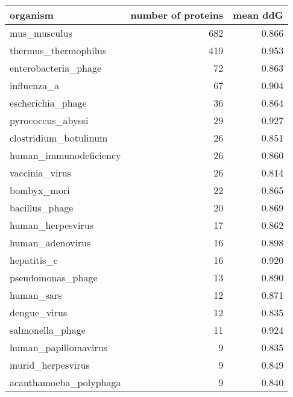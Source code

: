 \begin{tabular}{lrr}
\toprule
                                 organism &  number of proteins &  mean ddG \\
\midrule
                             mus\_musculus &                 682 &     0.866 \\
                     thermus\_thermophilus &                 419 &     0.953 \\
                     enterobacteria\_phage &                  72 &     0.863 \\
                              influenza\_a &                  67 &     0.904 \\
                        escherichia\_phage &                  36 &     0.864 \\
                        pyrococcus\_abyssi &                  29 &     0.927 \\
                    clostridium\_botulinum &                  26 &     0.851 \\
                   human\_immunodeficiency &                  26 &     0.860 \\
                           vaccinia\_virus &                  26 &     0.814 \\
                              bombyx\_mori &                  22 &     0.865 \\
                           bacillus\_phage &                  20 &     0.869 \\
                        human\_herpesvirus &                  17 &     0.862 \\
                         human\_adenovirus &                  16 &     0.898 \\
                              hepatitis\_c &                  16 &     0.920 \\
                        pseudomonas\_phage &                  13 &     0.890 \\
                               human\_sars &                  12 &     0.871 \\
                             dengue\_virus &                  12 &     0.835 \\
                         salmonella\_phage &                  11 &     0.924 \\
                     human\_papillomavirus &                   9 &     0.835 \\
                        murid\_herpesvirus &                   9 &     0.849 \\
                   acanthamoeba\_polyphaga &                   9 &     0.840 \\

\end{tabular}
